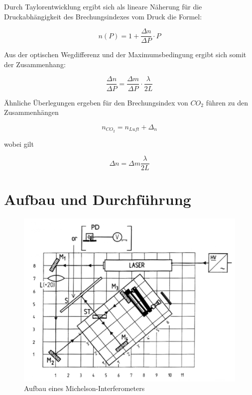 \documentclass[12pt,a4paper]{article}
\begin{document}
Durch Taylorentwicklung ergibt sich als lineare Näherung für die Druckabhängigkeit des Brechungsindexes vom Druck die Formel:

\begin{equation}
n(P) = 1+\frac{\Delta n}{\Delta P} \cdot P
\end{equation}

Aus der optischen Wegdifferenz und der Maximumsbedingung ergibt sich somit der Zusammenhang:

\begin{equation}
\frac{\Delta n}{\Delta P} = \frac{\Delta m}{\Delta P} \cdot  \frac{\lambda}{2L}
\label{equ:DruckBrechung}
\end{equation}

Ähnliche Überlegungen ergeben für den Brechungsindex von $CO_2$ führen zu den Zusammenhängen

\begin{equation}
n_{CO_2} = n_{Luft} + \Delta_n
\end{equation}

wobei gilt

\begin{equation}
\Delta n = \Delta m \frac{\lambda}{2L}
\end{equation}



\section{Aufbau und Durchführung}

\begin{figure}
\centering
\includegraphics[scale=0.6]{Bilder/Aufbau}
\caption{Aufbau eines Michelson-Interferometers}
\label{fig:Aufbau}
\end{figure}
\end{document}
